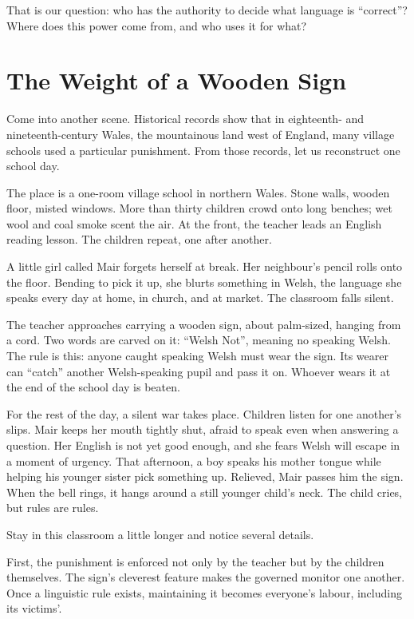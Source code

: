 That is our question: who has the authority to decide what language is ``correct''? Where does this power come from, and who uses it for what?

\section{The Weight of a Wooden Sign}
Come into another scene. Historical records show that in eighteenth- and nineteenth-century Wales, the mountainous land west of England, many village schools used a particular punishment. From those records, let us reconstruct one school day.

The place is a one-room village school in northern Wales. Stone walls, wooden floor, misted windows. More than thirty children crowd onto long benches; wet wool and coal smoke scent the air. At the front, the teacher leads an English reading lesson. The children repeat, one after another.

A little girl called Mair forgets herself at break. Her neighbour's pencil rolls onto the floor. Bending to pick it up, she blurts something in Welsh, the language she speaks every day at home, in church, and at market. The classroom falls silent.

The teacher approaches carrying a wooden sign, about palm-sized, hanging from a cord. Two words are carved on it: ``Welsh Not'', meaning no speaking Welsh. The rule is this: anyone caught speaking Welsh must wear the sign. Its wearer can ``catch'' another Welsh-speaking pupil and pass it on. Whoever wears it at the end of the school day is beaten.

For the rest of the day, a silent war takes place. Children listen for one another's slips. Mair keeps her mouth tightly shut, afraid to speak even when answering a question. Her English is not yet good enough, and she fears Welsh will escape in a moment of urgency. That afternoon, a boy speaks his mother tongue while helping his younger sister pick something up. Relieved, Mair passes him the sign. When the bell rings, it hangs around a still younger child's neck. The child cries, but rules are rules.

Stay in this classroom a little longer and notice several details.

First, the punishment is enforced not only by the teacher but by the children themselves. The sign's cleverest feature makes the governed monitor one another. Once a linguistic rule exists, maintaining it becomes everyone's labour, including its victims'.


